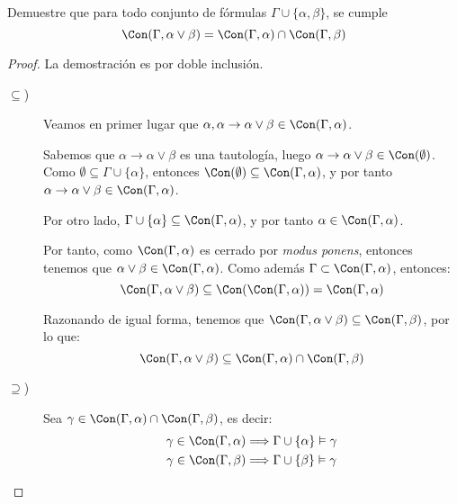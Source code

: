 \begin{ejercicio}
    Demuestre que para todo conjunto de fórmulas $\Gamma\cup\{\alpha,\beta\}$, se cumple
    \begin{equation*}
        \Con(\Gamma,\alpha\lor\beta) = \Con(\Gamma,\alpha) \cap \Con(\Gamma,\beta)
    \end{equation*}

    \begin{proof}
        La demostración es por doble inclusión.
        \begin{description}
            \item [$\subseteq$)] Veamos en primer lugar que $\alpha, \alpha\rightarrow\alpha\lor\beta\in \Con(\Gamma,\alpha)$.
            
                Sabemos que $\alpha\rightarrow\alpha\lor\beta$ es una tautología, luego
                $\alpha\rightarrow\alpha\lor\beta\in \Con(\emptyset)$.
                Como $\emptyset\subseteq \Gamma\cup\{\alpha\}$, entonces $\Con(\emptyset)\subseteq \Con(\Gamma,\alpha)$, y por tanto $\alpha\rightarrow\alpha\lor\beta\in \Con(\Gamma,\alpha)$.

                Por otro lado, $\Gamma\cup \{\alpha\}\subseteq \Con(\Gamma,\alpha)$, y por tanto $\alpha\in \Con(\Gamma,\alpha)$.

                Por tanto, como $\Con(\Gamma,\alpha)$ es cerrado por \emph{modus ponens}, entonces tenemos que $\alpha\lor\beta\in \Con(\Gamma,\alpha)$.
                Como además $\Gamma\subset \Con(\Gamma,\alpha)$, entonces:
                \begin{equation*}
                    \Con(\Gamma,\alpha\lor\beta)\subseteq \Con(\Con(\Gamma,\alpha)) = \Con(\Gamma,\alpha)
                \end{equation*}

                Razonando de igual forma, tenemos que $\Con(\Gamma,\alpha\lor\beta)\subseteq \Con(\Gamma,\beta)$, por lo que:
                \begin{equation*}
                    \Con(\Gamma,\alpha\lor\beta)\subseteq \Con(\Gamma,\alpha)\cap \Con(\Gamma,\beta)
                \end{equation*}

            \item [$\supseteq$)] Sea $\gamma\in \Con(\Gamma,\alpha)\cap \Con(\Gamma,\beta)$, es decir:
                \begin{align*}
                    \gamma\in \Con(\Gamma,\alpha) &\Longrightarrow \Gamma \cup \{\alpha\} \vDash \gamma \\
                    \gamma\in \Con(\Gamma,\beta) &\Longrightarrow \Gamma \cup \{\beta\} \vDash \gamma
                \end{align*}
                

\end{description}
\end{proof}
\end{ejercicio}
